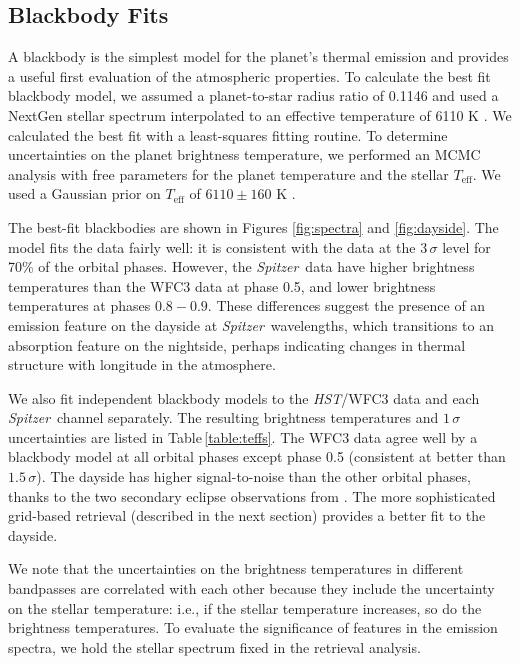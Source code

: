 \documentclass[twocolumn, trackchanges]{aastex61}
\newcommand{\project}[1]{\textsl{#1}}
\newcommand{\HST}{\project{HST}}
\newcommand{\Spitzer}{\project{Spitzer}}
\begin{document}
\subsection{Blackbody Fits}
\label{sec:bbfits}
A blackbody is the simplest model for the planet's thermal emission and provides a useful first evaluation of the atmospheric properties. To calculate the best fit blackbody model, we assumed a planet-to-star radius ratio of 0.1146 and used a NextGen stellar spectrum interpolated to an effective temperature of 6110 K \citep{allard12}.  We calculated the best fit with a least-squares fitting routine. To determine uncertainties on the planet brightness temperature, we performed an MCMC analysis with free parameters for the planet temperature and the stellar $T_\mathrm{eff}$. We used a Gaussian prior on $T_\mathrm{eff}$ of $6110 \pm 160$ K \citep{gillon14}.  

The best-fit blackbodies are shown in Figures \ref{fig:spectra} and \ref{fig:dayside}. The model fits the data fairly well: it is consistent with the data at the $3\,\sigma$ level for 70\% of the orbital phases. However, the \Spitzer\ data have higher brightness temperatures than the WFC3 data at phase 0.5, and lower brightness temperatures at phases $0.8 - 0.9$. These differences suggest the presence of an emission feature on the dayside at \Spitzer\ wavelengths, which transitions to an absorption feature on the nightside, perhaps indicating changes in thermal structure with longitude in the atmosphere. 

We also fit independent blackbody models to the \HST/WFC3 data and each \Spitzer\ channel separately. The resulting brightness temperatures and $1\,\sigma$ uncertainties are listed in Table\,\ref{table:teffs}.  The WFC3 data agree well by a blackbody model at all orbital phases except phase 0.5 (consistent at better than $1.5\,\sigma$). The dayside has higher signal-to-noise than the other orbital phases, thanks to the two secondary eclipse observations from \cite{cartier17}. The more sophisticated grid-based retrieval (described in the next section) provides a better fit to the dayside. 

We note that the uncertainties on the brightness temperatures in
different bandpasses are correlated with each other because they include the
uncertainty on the stellar temperature: i.e., if the stellar temperature
increases, so do the brightness temperatures. To evaluate the significance of
features in the emission spectra, we hold the stellar spectrum fixed in the retrieval analysis.
\end{document}
